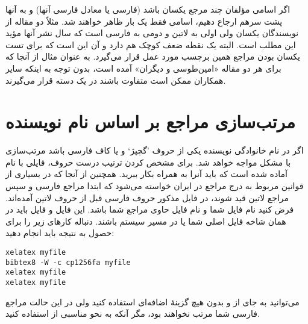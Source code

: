 \documentclass{article}
\theoremstyle{plain}\newtheorem{question}{پرسش}
\begin{document}
اگر اسامی مؤلفان چند مرجع یکسان باشد (فارسی یا معادل فارسی آنها) و  به آنها  پشت سرهم ارجاع دهیم، اسامی فقط یک بار ظاهر خواهند شد. مثلاً \citet{Amintoosi09precise,Amintoosi87afzayesh} دو مقاله از نویسندگان یکسان ولی اولی به لاتین و دومی به فارسی است که سال نشر آنها مؤید این مطلب است. 
 البته یک نقطه ضعف کوچک هم دارد و آن این است که برای تست یکسان بودن مراجع همین برچسب مورد عمل قرار می‌گیرد. به عنوان مثال از آنجا که برای هر دو مقاله «امین‌طوسی و دیگران» آمده است، بدون توجه به اینکه سایر همکاران ممکن است متفاوت باشند در یک دسته قرار می‌گیرند.


\section{مرتب‌سازی مراجع بر اساس نام نویسنده}\label{Sec:sorting}
اگر در نام خانوادگی نویسنده‌ یکی از حروف 'گچپژ` و یا کاف فارسی باشد مرتب‌سازی با مشکل مواجه خواهد شد. برای مشخص کردن ترتیب درست حروف، فایلی با نام  آماده شده است که باید آنرا به همراه  بکار ببرید. همچنین از آنجا که در بسیاری از قوانین مربوط به درج مراجع در ایران خواسته می‌شود که ابتدا مراجع فارسی و سپس مراجع لاتین قید شوند، در فایل مذکور حروف فارسی قبل از حروف لاتین آمده‌اند.
فرض کنید نام فایل شما  و نام فایل حاوی مراجع شما  باشد. این فایل و فایل  باید در همان شاخه فایل اصلی شما یا در مسیر سیستم باشند. 
دنباله کارهای زیر را برای حصول به نتیجه باید انجام دهید:
\begin{LTR}
\begin{verbatim}
xelatex myfile
bibtex8 -W -c cp1256fa myfile
xelatex myfile
xelatex myfile
\end{verbatim}
\end{LTR}
می‌توانید به جای  از {}  و بدون هیچ گزینهٔ اضافه‌ای استفاده کنید ولی در این حالت مراجع فارسی شما مرتب نخواهند بود، مگر آنکه به نحو مناسبی از  استفاده کنید. 
\end{document}
